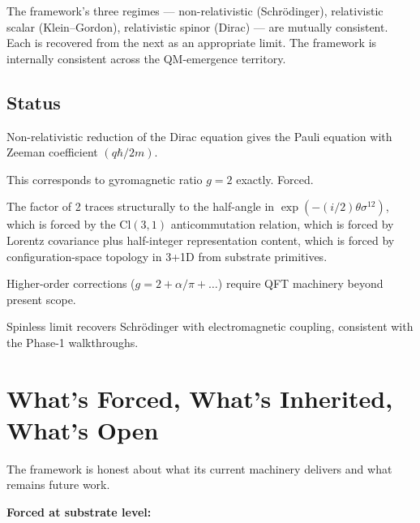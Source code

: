 \documentclass[11pt,a4paper]{article}
\begin{document}
The framework's three regimes --- non-relativistic (Schr\"odinger), relativistic scalar (Klein--Gordon), relativistic spinor (Dirac) --- are mutually consistent. Each is recovered from the next as an appropriate limit. The framework is internally consistent across the QM-emergence territory.

\subsection{Status}

Non-relativistic reduction of the Dirac equation gives the Pauli equation with Zeeman coefficient $(q\hbar/2m)$.

This corresponds to gyromagnetic ratio $g = 2$ exactly. Forced.

The factor of 2 traces structurally to the half-angle in $\exp(-(i/2)\theta\sigma^{12})$, which is forced by the $\mathrm{Cl}(3,1)$ anticommutation relation, which is forced by Lorentz covariance plus half-integer representation content, which is forced by configuration-space topology in 3+1D from substrate primitives.

Higher-order corrections ($g = 2 + \alpha/\pi + \ldots$) require QFT machinery beyond present scope.

Spinless limit recovers Schr\"odinger with electromagnetic coupling, consistent with the Phase-1 walkthroughs.

\section{What's Forced, What's Inherited, What's Open}

The framework is honest about what its current machinery delivers and what remains future work.

\textbf{Forced at substrate level:}
\end{document}
